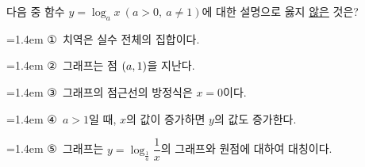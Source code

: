 다음 중 함수 $y=\log_a x\ (a>0,\ a\ne 1)$에 대한 설명으로 옳지 \underline{않은} 것은?
\par\medskip\par\noindent\hangindent=1.4em {\small ①}\ 치역은 실수 전체의 집합이다.\par\noindent\hangindent=1.4em {\small ②}\ 그래프는 점 $(a{,}\mkern3mu\mathopen{}1)$을 지난다.\par\noindent\hangindent=1.4em {\small ③}\ 그래프의 점근선의 방정식은 $x=0$이다.\par\noindent\hangindent=1.4em {\small ④}\ $a>1$일 때, $x$의 값이 증가하면 $y$의 값도 증가한다.\par\noindent\hangindent=1.4em {\small ⑤}\ 그래프는 $y=\log_{\frac{1}{a}} \dfrac{1}{x}$의 그래프와 원점에 대하여 대칭이다.\par\medskip
